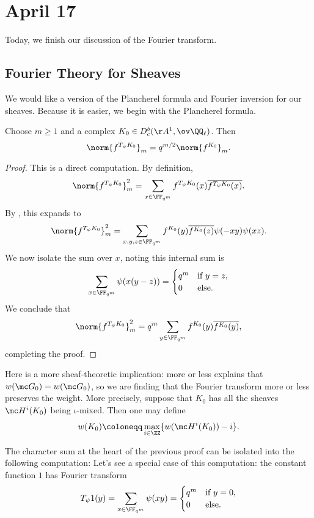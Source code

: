 \documentclass[../notes.tex]{subfiles}
\begin{document}
\section{April 17}
Today, we finish our discussion of the Fourier transform.

\subsection{Fourier Theory for Sheaves}
We would like a version of the Plancherel formula and Fourier inversion for our sheaves. Because it is easier, we begin with the Plancherel formula.
\begin{theorem}[Plancherel]
	Choose $m\ge1$ and a complex $K_0\in D^b_c(\AA^1,\ov\QQ_\ell)$. Then
	\[\norm{f^{T_\psi K_0}}_m=q^{m/2}\norm{f^{K_0}}_m.\]
\end{theorem}
\begin{proof}
	This is a direct computation. By definition,
	\[\norm{f^{T_\psi K_0}}_m^2=\sum_{x\in\FF_{q^m}}f^{T_\psi K_0}(x)\overline{f^{T_\psi K_0}(x)}.\]
	By , this expands to
	\[\norm{f^{T_\psi K_0}}_m^2=\sum_{x,y,z\in\FF_{q^m}}f^{K_0}(y)\overline{f^{K_0}(z)}\psi(-xy)\psi(xz).\]
	We now isolate the sum over $x$, noting this internal sum is
	\[\sum_{x\in\FF_{q^m}}\psi(x(y-z))=\begin{cases}
		q^m & \text{if }y=z, \\
		0 & \text{else}.
	\end{cases}\]
	We conclude that
	\[\norm{f^{T_\psi K_0}}_m^2=q^m\sum_{y\in\FF_{q^m}}f^{K_0}(y)\overline{f^{K_0}(y)},\]
	completing the proof.
\end{proof}
\begin{remark}
	Here is a more sheaf-theoretic implication:  more or less explains that $w(\mc G_0)=w(\mc G_0)$, so we are finding that the Fourier transform more or less preserves the weight. More precisely, suppose that $K_0$ has all the sheaves $\mc H^i(K_0)$ being $\iota$-mixed. Then one may define
	\[w(K_0)\coloneqq\max_{i\in\ZZ}\{w(\mc H^i(K_0))-i\}.\]
\end{remark}
The character sum at the heart of the previous proof can be isolated into the following computation: Let's see a special case of this computation: the constant function $1$ has Fourier transform
\[T_\psi1(y)=\sum_{x\in\FF_{q^m}}\psi(xy)=\begin{cases}
	q^m & \text{if }y=0, \\
	0 & \text{else}.
\end{cases}\]
\end{document}
